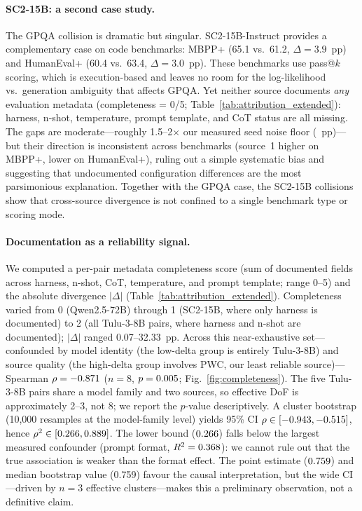 \documentclass[11pt]{article}
\begin{document}
\paragraph{SC2-15B: a second case study.}
The GPQA collision is dramatic but singular. SC2-15B-Instruct
provides a complementary case on code benchmarks: MBPP+ (65.1
vs.\ 61.2, $\Delta = 3.9$~pp) and HumanEval+ (60.4 vs.\ 63.4,
$\Delta = 3.0$~pp). These benchmarks use pass@$k$ scoring, which
is execution-based and leaves no room for the log-likelihood
vs.\ generation ambiguity that affects GPQA. Yet neither source
documents \emph{any} evaluation metadata (completeness = 0/5;
Table~\ref{tab:attribution_extended}): harness, n-shot, temperature,
prompt template, and CoT status are all missing. The gaps are
moderate---roughly 1.5--2$\times$ our measured seed noise floor
(\noisefloor{}~pp)---but their direction is inconsistent across
benchmarks (source~1 higher on MBPP+, lower on HumanEval+),
ruling out a simple systematic bias and suggesting that
undocumented configuration differences are the most parsimonious
explanation. Together with the GPQA case, the SC2-15B collisions
show that cross-source divergence is not confined to a single
benchmark type or scoring mode.

\paragraph{Documentation as a reliability signal.}
We computed a per-pair metadata completeness score (sum of
documented fields across harness, n-shot, CoT, temperature, and
prompt template; range 0--5) and the absolute divergence
$|\Delta|$ (Table~\ref{tab:attribution_extended}). Completeness
varied from 0 (Qwen2.5-72B) through 1 (SC2-15B, where only harness
is documented) to 2 (all Tulu-3-8B pairs, where harness and n-shot
are documented);
$|\Delta|$ ranged 0.07--32.33~pp. Across this near-exhaustive
set---confounded by model identity (the low-delta group is
entirely Tulu-3-8B) and source quality (the high-delta group
involves PWC, our least reliable source)---Spearman
$\rho = -0.871{}$ ($n = 8$, $p = 0.005{}$; Fig.~\ref{fig:completeness}).
The five Tulu-3-8B pairs share a model family and two sources,
so effective DoF is approximately 2--3, not 8; we report the
$p$-value descriptively.
A cluster bootstrap (10{,}000 resamples at the model-family level)
yields 95\% CI $\rho \in [-0.943{}, -0.515{}]$, hence
$\rho^2 \in [0.266{}, 0.889{}]$. The lower bound
($0.266{}$) falls below the largest measured confounder
(prompt format, $R^2 = 0.368{}$): we cannot rule out that
the true association is weaker than the format effect. The point
estimate ($0.759{}$) and median bootstrap value (0.759)
favour the causal interpretation, but the wide CI---driven by $n = 3$
effective clusters---makes this a preliminary observation, not a
definitive claim.
\end{document}
